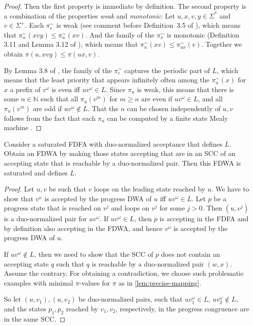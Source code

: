 \documentclass[a4paper,USenglish,cleveref,autoref,thm-restate]{lipics-v2021}
\begin{document}
{\begin{proof}
  Then the first property is immediate by definition. The second property is a combination of the properties \textit{weak} and \textit{monotonic}: Let $u,x,v,y \in \Sigma^*$ and $v \in \Sigma^+$. Each $\pi_c^\sim$ is weak (see comment before Definition~3.5 of \cite{BohnL24}), which means that $\pi_u^\sim(xvy) \le \pi_u^\sim(xv)$. And the family of the $\pi_x^\sim$ is monotonic (Definition 3.11 and Lemma 3.12 of \cite{BohnL24}), which means that $\pi_u^\sim(xv) \le \pi_{ux}^\sim(v)$. Together we obtain $\pi(u,xvy) \le \pi(ux,v)$.

  By Lemma 3.8 of \cite{BohnL24}, the family of the $\pi_c^\sim$ captures the periodic part of $L$, which means that the least priority that appears infinitely often among the $\pi_u^\sim(x)$ for $x$ a prefix of $v^\omega$ is even iff $uv^\omega \in L$. Since $\pi_u$ is weak, this means that there is some $n \in \mathbb{N}$ such that all $\pi_u(v^m)$ for $m \ge n$ are even if $uv^\omega \in L$, and all $\pi_u(v^m)$ are odd if $uv^\omega \not\in L$. That the $n$ can be chosen independently of $u,v$ follows from the fact that each $\pi_u$ can be computed by a finite state Mealy machine \cite[Theorem 3.6]{BohnL24}.
\end{proof}


\begin{lemma}
Consider a saturated FDFA with duo-normalized acceptance that defines $L$. Obtain an FDWA by making those states accepting that are in an SCC of an accepting state that is reachable by a duo-normalized pair. Then this FDWA is saturated and defines $L$.
\end{lemma}
\begin{proof}
  Let $u,v$ be such that $v$ loops on the leading state reached by $u$. We have to show that $v^\omega$ is accepted by the progress DWA of $u$ iff $uv^\omega \in L$. Let $p$ be a progress state that is reached on $v^j$ and loops on $v^j$ for some $j > 0$. Then $(u,v^j)$ is a duo-normalized pair for $uv^\omega$. If $uv^\omega \in L$, then $p$ is accepting in the FDFA and by definition also accepting in the FDWA, and hence $v^\omega$ is accepted by the progress DWA of $u$. 

  If $uv^\omega \not\in L$, then we need to show that the SCC of $p$ does not contain an accepting state $q$ such that $q$ is reachable by a duo-normalized pair $(w,x)$. Assume the contrary. For obtaining a contradiction, we choose such problematic examples with minimal $\pi$-values for $\pi$ as in \cref{lem:precise-mapping}.

  So let $(u,v_1),(u,v_2)$ be duo-normalized pairs, such that $uv_1^\omega \in L$, $uv_2^\omega \not\in L$, and the states $p_1,p_2$ reached by $v_1,v_2$, respectively, in the progress congruence  are in the same SCC.


\end{proof}}
\end{document}
